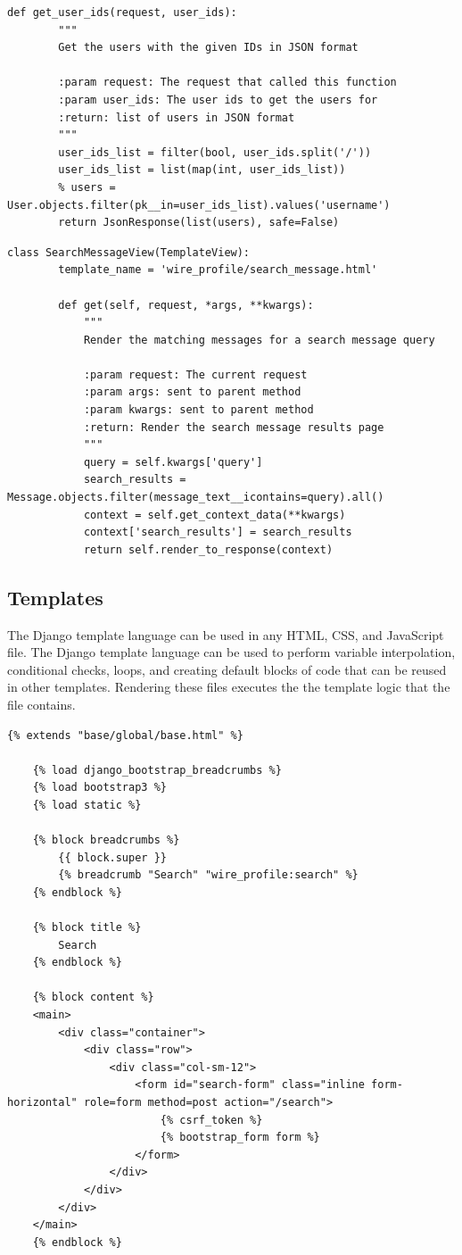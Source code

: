 \begin{lstlisting}[caption={Function-based view for returning user data},label={code:djangoGetUserIds}]
	def get_user_ids(request, user_ids):
		"""
		Get the users with the given IDs in JSON format

		:param request: The request that called this function
		:param user_ids: The user ids to get the users for
		:return: list of users in JSON format
		"""
		user_ids_list = filter(bool, user_ids.split('/'))
		user_ids_list = list(map(int, user_ids_list))
		% users = User.objects.filter(pk__in=user_ids_list).values('username')
		return JsonResponse(list(users), safe=False)
\end{lstlisting}

\begin{lstlisting}[caption={Class-based view to search for a given message},label={code:djangoSearchMessage}]
	class SearchMessageView(TemplateView):
		template_name = 'wire_profile/search_message.html'

		def get(self, request, *args, **kwargs):
			"""
			Render the matching messages for a search message query

			:param request: The current request
			:param args: sent to parent method
			:param kwargs: sent to parent method
			:return: Render the search message results page
			"""
			query = self.kwargs['query']
			search_results = Message.objects.filter(message_text__icontains=query).all()
			context = self.get_context_data(**kwargs)
			context['search_results'] = search_results
			return self.render_to_response(context)
\end{lstlisting}

\subsection{Templates}
The Django template language can be used in any HTML, CSS, and JavaScript
file. The Django template language can be used to perform variable interpolation,
conditional checks, loops, and creating default blocks of code that can be reused
in other templates. Rendering these files executes the the template logic that the
file contains. \parencite{djangoTemplates}

\begin{lstlisting}[caption={Template file for the search page},label={code:djangoSearchTemplate}]
	{% extends "base/global/base.html" %}

	{% load django_bootstrap_breadcrumbs %}
	{% load bootstrap3 %}
	{% load static %}
	
	{% block breadcrumbs %}
		{{ block.super }}
		{% breadcrumb "Search" "wire_profile:search" %}
	{% endblock %}
	
	{% block title %}
		Search
	{% endblock %}
	
	{% block content %}
	<main>
		<div class="container">
			<div class="row">
				<div class="col-sm-12">
					<form id="search-form" class="inline form-horizontal" role=form method=post action="/search">
						{% csrf_token %}
						{% bootstrap_form form %}
					</form>
				</div>
			</div>
		</div>
	</main>
	{% endblock %}
\end{lstlisting}

